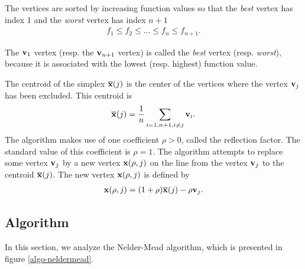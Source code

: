 The vertices are sorted by increasing function values so that the 
\emph{best} vertex has index 1 and the \emph{worst} vertex 
has index $n+1$
\begin{eqnarray}
\label{nm-sorted-vertices-fv}
f_1 \leq f_2 \leq \ldots \leq f_n \leq f_{n+1}.
\end{eqnarray}

The $\mathbf{v}_1$ vertex (resp. the $\mathbf{v}_{n+1}$ vertex) is called the \emph{best} 
vertex (resp. \emph{worst}), because it is associated with the lowest (resp. highest)
function value. 

The centroid of the simplex $\overline{\mathbf{x}} (j)$ is the center of the vertices
where the vertex $\mathbf{v}_j$ has been 
excluded. This centroid is 
\begin{eqnarray}
\label{nm-centroid-generalized}
\overline{\mathbf{x}} (j) = 
\frac{1}{n} \sum_{i=1,n+1, i\neq j} \mathbf{v}_i.
\end{eqnarray}
The algorithm makes use
of one coefficient $\rho>0$, called the reflection factor. The standard
value of this coefficient is $\rho=1$.
The algorithm attempts to replace some vertex 
$\mathbf{v}_j$ by a new vertex $\mathbf{x}(\rho,j)$ on the line from the vertex $\mathbf{v}_j$
to the centroid  $\overline{\mathbf{x}}(j)$. The new vertex $\mathbf{x}(\rho,j)$ is defined by 
\begin{eqnarray}
\label{nm-interpolate-generalized}
\mathbf{x}(\rho,j) = (1+\rho)\overline{\mathbf{x}}(j) - \rho \mathbf{v}_j.
\end{eqnarray}

\subsection{Algorithm}

In this section, we analyze the Nelder-Mead algorithm, which
is presented in figure \ref{algo-neldermead}.

